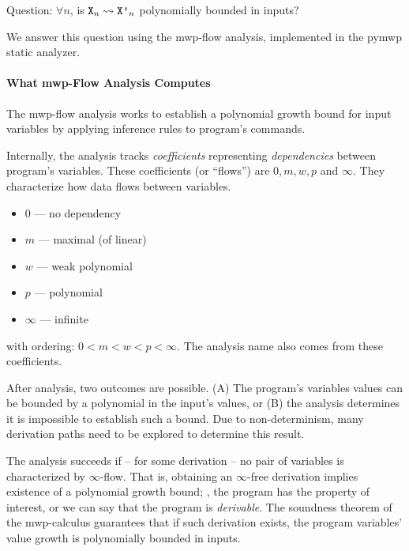 Question: \(\forall n\), is \(\prm{X}_n \rightsquigarrow \prm{X'}_n\) polynomially bounded in inputs?

We answer this question using the mwp-flow analysis, implemented in the pymwp static analyzer.

\paragraph*{What mwp-Flow Analysis Computes}

The mwp-flow analysis works to establish a polynomial growth bound for input variables by applying inference rules to program's commands.

Internally, the analysis tracks \emph{coefficients} representing \emph{dependencies} between program's variables.
These coefficients (or \enquote{flows}) are \(0, m, w, p\) and \(\infty\).
They characterize how data flows between variables.

\begin{itemize}
\item \(0\) --- no dependency
\item \(m\) --- maximal (of linear)
\item \(w\) --- weak polynomial
\item \(p\) --- polynomial
\item \(\infty\) --- infinite
\end{itemize}

with ordering: \(0 < m < w < p < \infty\).
The analysis name also comes from these coefficients.

After analysis, two outcomes are possible.
(A) The program's variables values can be bounded by a polynomial in the input's values, or (B) the analysis determines it is impossible to establish such a bound.
Due to non-determinism, many derivation paths need to be explored to determine this result.

The analysis succeeds if -- for some derivation -- no pair of variables is characterized by \(\infty\)-flow.
That is, obtaining an \(\infty\)-free derivation implies existence of a polynomial growth bound;
\ie, the program has the property of interest, or we can say that the program is \emph{derivable}.
The soundness theorem of the mwp-calculus guarantees that if such derivation exists, the program variables' value growth is polynomially bounded in inputs.

